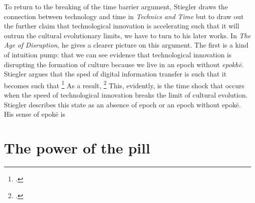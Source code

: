 \documentclass[letterpaper,notitlepage,12pt]{article}
\begin{document}
To return to the breaking of the time barrier argument, Stiegler draws the
connection between technology and time in \textit{Technics and Time} but to draw
out the further claim that technological innovation is accelerating such that it
will outrun the cultural evolutionary limits, we have to turn to his later
works.
In \textit{The Age of Disruption}, he gives a clearer picture on this argument.
The first is a kind of intuition pump: that we can see evidence that
technological innovation is disrupting the formation of culture because we live
in an epoch without \textit{epokh\={e}}. Stiegler argues that the sped of
digital information transfer is such that it becomes  such that \footcite[ch. 1.4]{stiegler_age_2010}
As a result, \footcite[ch. 1.5]{stiegler_age_2019}
This, evidently, is the time shock that occurs when the speed of technological
innovation breaks the limit of cultural evolution.
Stiegler describes this state as an absence of epoch or an epoch without
epok\={e}.
His sense of epok\={e} is

\section{The power of the pill}


\end{document}
